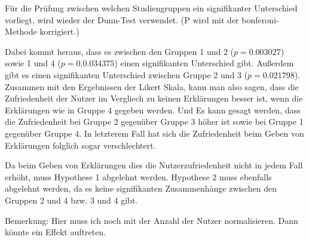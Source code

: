 Für die Prüfung zwischen welchen Studiengruppen ein signifikanter Unterschied vorliegt, wird wieder der Dunn-Test \cite{dunn1964multiple} verwendet. (P wird mit der \glqq bonferoni\grqq{}-Methode korrigiert.)

Dabei kommt heraus, dass es zwischen den Gruppen 1 und 2 ($ p = 0.003027$) sowie 1 und 4 ($ p = 0.0.034375 $) einen signifikanten Unterschied gibt. Außerdem gibt es einen signifikanten Unterschied zwischen Gruppe 2 und 3 ($ p = 0.021798 $). Zusammen mit den Ergebnissen der Likert Skala, kann man also sagen, dass die Zufriedenheit der Nutzer im Vergliech zu keinen Erklärungen besser ist, wenn die Erklärungen wie in Gruppe 4 gegeben werden. Und Es kann gesagt werden, dass die Zufriedenheit bei Gruppe 2 gegenüber Gruppe 3 höher ist sowie bei Gruppe 1 gegenüber Gruppe 4. In letzterem Fall hat sich die Zufriedenheit beim Geben von Erklärungen folglich sogar verschlechtert.

Da beim Geben von Erklärungen dies die Nutzerzufriedenheit nicht in jedem Fall erhöht, muss Hypothese 1 abgelehnt werden. Hypothese 2 muss ebenfalls abgelehnt werden, da es keine signifikanten Zusammenhänge zwischen den Gruppen 2 und 4 bzw. 3 und 4 gibt.

Bemerkung: Hier muss ich noch mit der Anzahl der Nutzer normalisieren. Dann könnte ein Effekt auftreten.